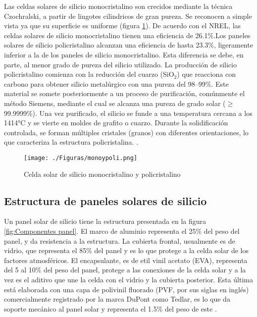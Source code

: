  Las celdas solares de silicio monocristalino son crecidos mediante la técnica Czochralski, a partir de lingotes cilindricos de gran pureza. Se reconocen a simple vista ya que su superficie es uniforme (figura \ref{fig:mono y poli}). De acuerdo con el NREL, las celdas solares de silicio monocristalino tienen una eficiencia de 26.1\%.Los paneles solares de silicio policristalino alcanzan una eficiencia de hasta 23.3\%, ligeramente inferior a la de los paneles de silicio monocristalino. Esta diferencia se debe, en parte, al menor grado de pureza del silicio utilizado. La producción de silicio policristalino comienza con la reducción del cuarzo (SiO$_{2}$) que reacciona con carbono para obtener silicio metalúrgico con una pureza del 98–99\%. Este material se somete posteriormente a un proceso de purificación, comúnmente el método Siemens, mediante el cual se alcanza una pureza de grado solar ($\geq$99.9999\%). Una vez purificado, el silicio se funde a una temperatura cercana a los 1414°C y se vierte en moldes de grafito o cuarzo. Durante la solidificación controlada, se forman múltiples cristales (granos) con diferentes orientaciones, lo que caracteriza la estructura policristalina. \citep{Funcan2011, Aully2016}.
  
 \begin{figure}[htb]
 	\begin{center}
 		\texttt{[image: ./Figuras/monoypoli.png]}
 	\end{center}
 	\vspace{-1em} %
 	\caption{Celda solar de silicio monocristalino y policristalino}
 	\label{fig:mono y poli}
 \end{figure}
 
  \subsection{Estructura de paneles solares de silicio}
 \label{sec:Estructura paneles}
  
  Un panel solar de silicio tiene la estructura presentada en la figura \ref{fig:Componentes panel}. El marco de aluminio representa el 25\% del peso del panel, y da resistencia a la estructura. La cubierta frontal, usualmente es de vidrio, que representa el 85\% del panel y es lo que protege a la celda solar de los factores atmosféricos. El encapsulante, es de etil vinil acetato (EVA), representa del 5 al 10\% del peso del panel, protege a las conexiones de la celda solar y a la vez es el aditivo que une la celda con el vidrio y la cubierta posterior. Esta última está elaborada con una capa de polivinil fluorado (PVF, por sus siglas en inglés) comercialmente registrado por la marca DuPont como Tedlar, es lo que da soporte mecánico al panel solar y representa el 1.5\% del peso de este \citep{Fiandra2019}. 
  
